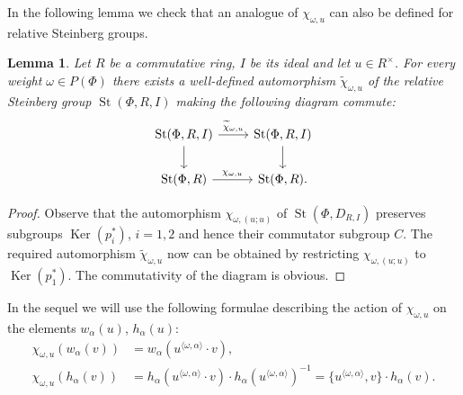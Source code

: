 \documentclass[oneside, 10pt]{amsart}
\DeclareMathOperator{\St}{St}
\DeclareMathOperator{\Ker}{Ker}
\numberwithin{equation}{section}
\numberwithin{thm}{section}
\newtheorem{lemma}[thm]{Lemma}
\numberwithin{lemma}{section}
\theoremstyle{definition}
\theoremstyle{remark}
\begin{document}
In the following lemma we check that an analogue of $\chi_{\omega, u}$ can also be defined for relative Steinberg groups.
\begin{lemma} \label{lem:relative-chi}
Let $R$ be a commutative ring, $I$ be its ideal and let $u \in R^\times$.
For every weight $\omega \in P(\Phi)$ there exists a well-defined automorphism $\widetilde{\chi}_{\omega, u}$ of the relative Steinberg group $\St(\Phi, R, I)$ making the following diagram commute:
\[\begin{tikzcd} \St(\Phi, R, I) \ar[r, "\widetilde{\chi}_{\omega, u}"] \ar[d] & \St(\Phi, R, I) \ar[d] \\
\St(\Phi, R) \ar[r, "\chi_{\omega, u}"] & \St(\Phi, R). \end{tikzcd}\]
\end{lemma}
\begin{proof}
Observe that the automorphism $\chi_{\omega, (u; u)}$ of $\St(\Phi, D_{R, I})$ preserves subgroups
$\Ker(p_i^*)$, $i=1, 2$ and hence their commutator subgroup $C$.
The required automorphism $\widetilde{\chi}_{\omega, u}$ now can be obtained by restricting $\chi_{\omega, (u; u)}$ to $\Ker(p_1^*)$.
The commutativity of the diagram is obvious.
\end{proof}

In the sequel we will use the following formulae describing the action of $\chi_{\omega, u}$ on the elements $w_\alpha(u)$, $h_\alpha(u)$:
\begin{align}
\label{eq:chi-w} \chi_{\omega, u}\left(w_\alpha(v)\right) &= w_\alpha(u^{\langle \omega, \alpha \rangle} \cdot v), \\
\label{eq:chi-h} \chi_{\omega, u} (h_\alpha(v)) &= h_\alpha(u^{\langle \omega, \alpha \rangle} \cdot v) \cdot h_\alpha(u^{\langle \omega, \alpha\rangle})^{-1} = \{u^{\langle \omega, \alpha\rangle}, v\} \cdot h_\alpha(v).
\end{align}
\end{document}
